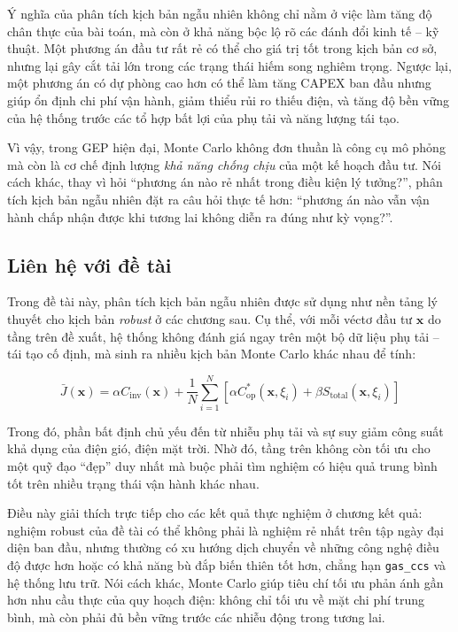 Ý nghĩa của phân tích kịch bản ngẫu nhiên không chỉ nằm ở việc làm tăng độ chân thực của bài toán, mà còn ở khả năng bộc lộ rõ các đánh đổi kinh tế -- kỹ thuật. Một phương án đầu tư rất rẻ có thể cho giá trị tốt trong kịch bản cơ sở, nhưng lại gây cắt tải lớn trong các trạng thái hiếm song nghiêm trọng. Ngược lại, một phương án có dự phòng cao hơn có thể làm tăng CAPEX ban đầu nhưng giúp ổn định chi phí vận hành, giảm thiểu rủi ro thiếu điện, và tăng độ bền vững của hệ thống trước các tổ hợp bất lợi của phụ tải và năng lượng tái tạo.

Vì vậy, trong GEP hiện đại, Monte Carlo không đơn thuần là công cụ mô phỏng mà còn là cơ chế định lượng \textit{khả năng chống chịu} của một kế hoạch đầu tư. Nói cách khác, thay vì hỏi ``phương án nào rẻ nhất trong điều kiện lý tưởng?'', phân tích kịch bản ngẫu nhiên đặt ra câu hỏi thực tế hơn: ``phương án nào vẫn vận hành chấp nhận được khi tương lai không diễn ra đúng như kỳ vọng?''.

\subsection{Liên hệ với đề tài}

Trong đề tài này, phân tích kịch bản ngẫu nhiên được sử dụng như nền tảng lý thuyết cho kịch bản \textit{robust} ở các chương sau. Cụ thể, với mỗi véctơ đầu tư $\mathbf{x}$ do tầng trên đề xuất, hệ thống không đánh giá ngay trên một bộ dữ liệu phụ tải -- tái tạo cố định, mà sinh ra nhiều kịch bản Monte Carlo khác nhau để tính:

\begin{equation}
    \bar{J}(\mathbf{x}) = \alpha C_{\text{inv}}(\mathbf{x}) + \frac{1}{N} \sum_{i=1}^{N} \left[ \alpha C_{\text{op}}^*(\mathbf{x}, \xi_i) + \beta S_{\text{total}}(\mathbf{x}, \xi_i) \right]
\end{equation}

Trong đó, phần bất định chủ yếu đến từ nhiễu phụ tải và sự suy giảm công suất khả dụng của điện gió, điện mặt trời. Nhờ đó, tầng trên không còn tối ưu cho một quỹ đạo ``đẹp'' duy nhất mà buộc phải tìm nghiệm có hiệu quả trung bình tốt trên nhiều trạng thái vận hành khác nhau.

Điều này giải thích trực tiếp cho các kết quả thực nghiệm ở chương kết quả: nghiệm robust của đề tài có thể không phải là nghiệm rẻ nhất trên tập ngày đại diện ban đầu, nhưng thường có xu hướng dịch chuyển về những công nghệ điều độ được hơn hoặc có khả năng bù đắp biến thiên tốt hơn, chẳng hạn \texttt{gas\_ccs} và hệ thống lưu trữ. Nói cách khác, Monte Carlo giúp tiêu chí tối ưu phản ánh gần hơn nhu cầu thực của quy hoạch điện: không chỉ tối ưu về mặt chi phí trung bình, mà còn phải đủ bền vững trước các nhiễu động trong tương lai.

